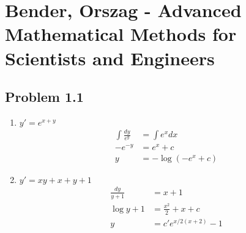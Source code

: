 \documentclass[../main.tex]{subfiles}
\begin{document}
\section{{\sc Bender, Orszag} - Advanced Mathematical Methods for Scientists and Engineers}
\subsection{Problem 1.1}
\begin{enumerate}
    \item $y'=e^{x+y}$
    \begin{align}
        \int\frac{dy}{e^y}&=\int e^xdx\\
        -e^{-y}&=e^x+c\\
        y&=-\log\left(-e^x+c\right)
    \end{align}
    \item $y'=xy+x+y+1$
    \begin{align}
        \frac{dy}{y+1}&=x+1\\
        \log y+1&=\frac{x^2}{2}+x+c\\
        y&=c'e^{x/2(x+2)}-1
    \end{align}
\end{enumerate}
\end{document}
